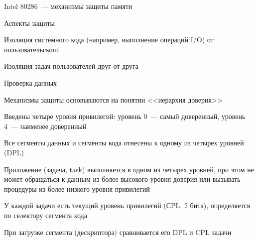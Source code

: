 \documentclass[aspectratio=169,14pt]{beamer}
\begin{document}
\begin{frame}{Intel 80286~--- механизмы защиты памяти}
    \begin{itemize}
        \begin{footnotesize}
        \item Аспекты защиты
        \begin{itemize}
            \begin{footnotesize}
            \item Изоляция системного кода (например, выполнение
            операций I/O) от пользовательского
            \item Изоляция задач пользователей друг от друга
            \item Проверка данных
            \end{footnotesize}
        \end{itemize}
        \item Механизмы защиты основываются на понятии <<иерархия доверия>>
        \item Введены четыре уровня привилегий: уровень 0~--- самый
        доверенный, уровень 4~--- наименее доверенный
        \item Все сегменты данных и сегменты кода отнесены к одному
        из четырех уровней (DPL)
        \item Приложение (задача, task) выполняется в одном из
        четырех уровней, при этом не может обращаться к данным из
        более высокого уровня доверия или вызывать процедуры
        из более низкого уровня привилегий
        \item У каждой задачи есть текущий уровень
        привилегий (СPL, 2 бита), определяется по селектору сегмента кода
        \item При загрузке сегмента (дескриптора) сравнивается его DPL и CPL задачи
        \end{footnotesize}
    \end{itemize}
\end{frame}
\end{document}
